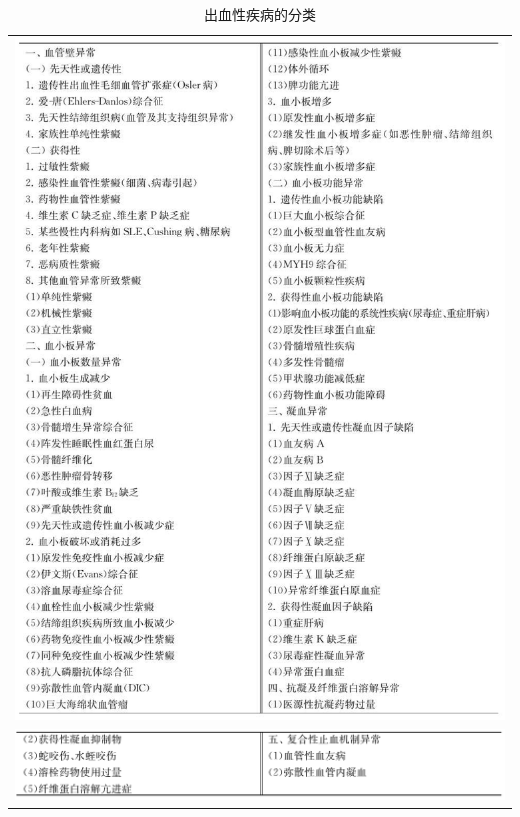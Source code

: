 \begin{longtable}{c}
 \caption{出血性疾病的分类}
 \label{tab34-1}
 \endfirsthead
 \caption[]{出血性疾病的分类}
 \endhead
 \includegraphics[width=\textwidth,height=\textheight,keepaspectratio]{./images/Image00193.jpg}\\
 \includegraphics[width=\textwidth,height=\textheight,keepaspectratio]{./images/Image00194.jpg}
 \end{longtable}

